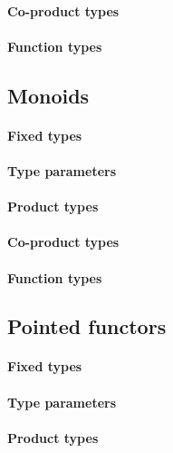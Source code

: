 \paragraph{Co-product types}

\paragraph{Function types}

\subsection{Monoids\label{subsec:Monoids-constructions}}

\paragraph{Fixed types}

\paragraph{Type parameters}

\paragraph{Product types}

\paragraph{Co-product types}

\paragraph{Function types}

\subsection{Pointed functors}

\paragraph{Fixed types}

\paragraph{Type parameters}

\paragraph{Product types}

